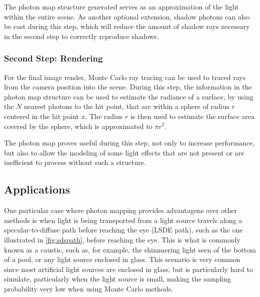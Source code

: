 \documentclass[main.tex]{subfiles}
\begin{document}
The photon map structure generated serves as an approximation of the light within the entire scene. As another optional extension, shadow photons can also be cast during this step, which will reduce the amount of shadow rays necessary in the second step to correctly reproduce shadows.



\subsubsection{Second Step: Rendering}

For the final image render, Monte Carlo ray tracing \cite{jensen2003monte} can be used to traced rays from the camera position into the scene. During this step, the information in the photon map structure can be used to estimate the radiance of a surface, by using the $N$ nearest photons to the hit point, that are within a sphere of radius $r$ centered in the hit point $x$. The radius $r$ is then used to estimate the surface area covered by the sphere, which is approximated to $\pi r^{2}$.

The photon map proves useful during this step, not only to increase performance, but also to allow the modeling of some light effects that are not present or are inefficient to process without such a structure.




\subsection{Applications}

One particular case where photon mapping provides advantagens over other methods is when light is being transported from a light source travels along a specular-to-diffuse path before reaching the eye (LSDE path), such as the one illustrated in \cref{fig:sdspath}, before reaching the eye. This is what is commonly known as a caustic, such as, for example, the shimmering light seen of the bottom of a pool, or any light source enclosed in glass. This scenario is very common since most artificial light sources are enclosed in glass, but is particularly hard to simulate, particularly when the light source is small, making the sampling probability very low when using Monte Carlo methods.
\end{document}
